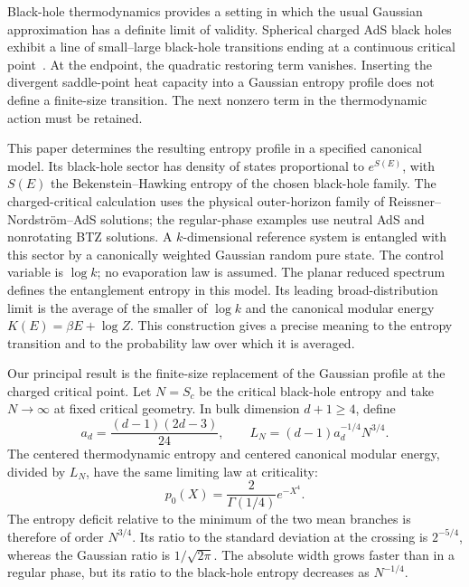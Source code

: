 \documentclass[11pt,letterpaper]{article}
\theoremstyle{plain}
\theoremstyle{definition}
\theoremstyle{remark}
\begin{document}
Black-hole thermodynamics provides a setting in which the usual Gaussian approximation has a definite limit of validity. Spherical charged AdS black holes exhibit a line of small--large black-hole transitions ending at a continuous critical point~\cite{chamblin1999,kubiznakmann2012}. At the endpoint, the quadratic restoring term vanishes. Inserting the divergent saddle-point heat capacity into a Gaussian entropy profile does not define a finite-size transition. The next nonzero term in the thermodynamic action must be retained.

This paper determines the resulting entropy profile in a specified canonical model. Its black-hole sector has density of states proportional to $e^{S(E)}$, with $S(E)$ the Bekenstein--Hawking entropy of the chosen black-hole family. The charged-critical calculation uses the physical outer-horizon family of Reissner--Nordstr\"om--AdS solutions; the regular-phase examples use neutral AdS and nonrotating BTZ solutions. A $k$-dimensional reference system is entangled with this sector by a canonically weighted Gaussian random pure state. The control variable is $\log k$; no evaporation law is assumed. The planar reduced spectrum defines the entanglement entropy in this model. Its leading broad-distribution limit is the average of the smaller of $\log k$ and the canonical modular energy $K(E)=\beta E+\log Z$. This construction gives a precise meaning to the entropy transition and to the probability law over which it is averaged.

Our principal result is the finite-size replacement of the Gaussian profile at the charged critical point. Let $N=S_c$ be the critical black-hole entropy and take $N\to\infty$ at fixed critical geometry. In bulk dimension $d+1\geq4$, define
\begin{equation}
 a_d=\frac{(d-1)(2d-3)}{24},\qquad
 L_N=(d-1)a_d^{-1/4}N^{3/4}.
 \label{eq01:scale}
\end{equation}
The centered thermodynamic entropy and centered canonical modular energy, divided by $L_N$, have the same limiting law at criticality:
\begin{equation}
 p_0(X)=\frac{2}{\Gamma(1/4)}e^{-X^4}.
 \label{eq01:quartic}
\end{equation}
The entropy deficit relative to the minimum of the two mean branches is therefore of order $N^{3/4}$. Its ratio to the standard deviation at the crossing is $2^{-5/4}$, whereas the Gaussian ratio is $1/\sqrt{2\pi}$. The absolute width grows faster than in a regular phase, but its ratio to the black-hole entropy decreases as $N^{-1/4}$.
\end{document}
